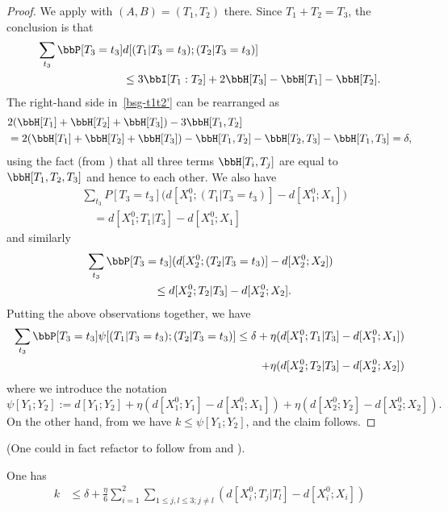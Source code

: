 \begin{proof} \leanok
  We apply  with $(A,B) = (T_1, T_2)$ there.
  Since $T_1 + T_2 = T_3$, the conclusion is that
  \begin{align} \nonumber \sum_{t_3} \bbP[T_3 = t_3] & d[(T_1 | T_3 = t_3); (T_2 | T_3 = t_3)] \\ & \leq 3 \bbI[T_1 : T_2] + 2 \bbH[T_3] - \bbH[T_1] - \bbH[T_2].\label{bsg-t1t2'}
  \end{align}
  The right-hand side in~\eqref{bsg-t1t2'} can be rearranged as
  \begin{align*} & 2( \bbH[T_1] + \bbH[T_2] + \bbH[T_3]) - 3 \bbH[T_1,T_2] \\ & = 2(\bbH[T_1] + \bbH[T_2] + \bbH[T_3]) - \bbH[T_1,T_2] - \bbH[T_2,T_3] - \bbH[T_1, T_3] = \delta,\end{align*}
  using the fact (from ) that all three terms $\bbH[T_i,T_j]$ are equal to $\bbH[T_1,T_2,T_3]$ and hence to each other.
  We also have
  \begin{align*}
  &  \sum_{t_3} P[T_3 = t_3] \bigl(d[X^0_1; (T_1 | T_3=t_3)] - d[X^0_1;X_1]\bigr) \\
  &\quad = d[X^0_1; T_1 | T_3] - d[X^0_1;X_1]
  \end{align*}
  and similarly
  \begin{align*}
  &  \sum_{t_3} \bbP[T_3 = t_3] (d[X^0_2;(T_2 | T_3=t_3)] - d[X^0_2; X_2]) \\
  &\quad\quad\quad\quad\quad\quad \leq d[X^0_2;T_2|T_3] - d[X^0_2;X_2].
  \end{align*}
  Putting the above observations together, we have
  \begin{align*}
   \sum_{t_3} \bbP[T_3=t_3] \psi[(T_1 | T_3=t_3); (T_2 | T_3=t_3)] \leq \delta + \eta (d[X^0_1;T_1|T_3]-d[X^0_1;X_1]) \\
     + \eta (d[X^0_2;T_2|T_3]-d[X^0_2;X_2])
   \end{align*}
where we introduce the notation
\[\psi[Y_1; Y_2] := d[Y_1;Y_2] +  \eta (d[X_1^0;Y_1] - d[X_1^0;X_1]) + \eta(d[X_2^0;Y_2] - d[X_2^0;X_2]).\]
On the other hand, from  we have $k \leq \psi[Y_1;Y_2]$, and the claim follows.
\end{proof}

(One could in fact refactor  to follow from  and ).

\begin{lemma}\label{construct-good-improv}\leanok
One has
\begin{align*}  k & \leq  \delta + \frac{\eta}{6}  \sum_{i=1}^2 \sum_{1 \leq j,l \leq 3; j \neq l} (d[X^0_i;T_j|T_l] - d[X^0_i; X_i])
  \end{align*}
\end{lemma}

